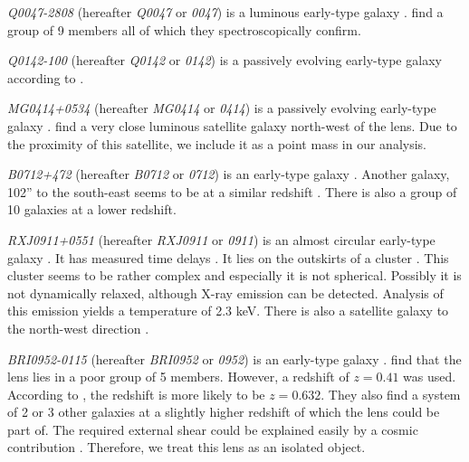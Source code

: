 \documentclass[10pt]{article}
\begin{document}
\textit{Q0047-2808} (hereafter \textit{Q0047} or \textit{0047}) is a luminous early-type galaxy \citep{1996MNRAS.278..139W}. \cite{2011ApJ...726...84W} find a group of 9 members all of which they spectroscopically confirm.

\textit{Q0142-100} (hereafter \textit{Q0142} or \textit{0142}) is a passively evolving early-type galaxy according to \citep{2000ApJ...536..584L,2007A&A...465...51E}.

\textit{MG0414+0534} (hereafter \textit{MG0414} or \textit{0414}) is a passively evolving early-type galaxy \citep{1999AJ....117.2034T}. \cite{1993AJ....105....1S} find a very close luminous satellite galaxy north-west of the lens. Due to the proximity of this satellite, we include it as a point mass in our analysis.

\textit{B0712+472} (hereafter \textit{B0712} or \textit{0712}) is an early-type galaxy \citep{1998AJ....115..377F}. Another galaxy, 102'' to the south-east seems to be at a similar redshift \citep{2002AJ....123..627F}. There is also a group of 10 galaxies at a lower redshift.

\textit{RXJ0911+0551} (hereafter \textit{RXJ0911} or \textit{0911}) is an almost circular early-type galaxy \citep{2012A&A...538A..99S}. It has measured time delays \citep{2002ApJ...572L..11H}. It lies on the outskirts of a cluster \citep{2001ApJ...555....1M}. This cluster seems to be rather complex and especially it is not spherical. Possibly it is not dynamically relaxed, although X-ray emission can be detected. Analysis of this emission yields a temperature of 2.3 keV. There is also a satellite galaxy to the north-west direction \citep{2000ApJ...544L..35K}.

\textit{BRI0952-0115} (hereafter \textit{BRI0952} or \textit{0952}) is an early-type galaxy \citep{2000ApJ...536..584L,2007A&A...465...51E}. \cite{2006ApJ...641..169M} find that the lens lies in a poor group of 5 members. However, a redshift of $z=0.41$ was used. According to \cite{2007A&A...465...51E}, the redshift is more likely to be $z=0.632$. They also find a system of 2 or 3 other galaxies at a slightly higher redshift of which the lens could be part of. The required external shear could be explained easily by a cosmic contribution \citep{2000ApJ...536..584L}. Therefore, we treat this lens as an isolated object.
\end{document}
